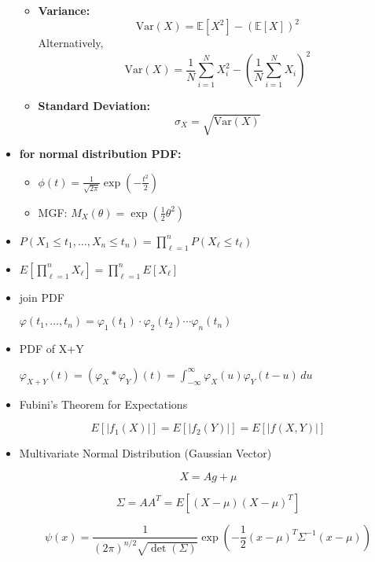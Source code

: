 \documentclass{article}
\begin{document}
\begin{itemize}
\begin{itemize}
\item \textbf{Variance:}
\[
\text{Var}(X) = \mathbb{E}[X^2] - (\mathbb{E}[X])^2
\]
Alternatively,
\[
\text{Var}(X) = \frac{1}{N} \sum_{i=1}^{N} X_i^2 - \left( \frac{1}{N} \sum_{i=1}^{N} X_i \right)^2
\]

\item \textbf{Standard Deviation:}
\[
\sigma_X = \sqrt{\text{Var}(X)}
\]
\end{itemize}

  \item \textbf{for normal distribution PDF:}

\begin{itemize}
\item  $
    \phi(t) = \frac{1}{\sqrt{2\pi}} \exp\left(-\frac{t^2}{2}\right)
    $
      \item MGF: $M_X(\theta) = \exp\left(\frac{1}{2} \theta^2\right)$
\end{itemize}
   

\item 
    $
    P(X_1 \leq t_1, \ldots, X_n \leq t_n) = \prod_{\ell=1}^{n} P(X_\ell \leq t_\ell)
    $

\item 

    $
    E\left[ \prod_{\ell=1}^{n} X_\ell \right] = \prod_{\ell=1}^{n} E[X_\ell]
    $

\item join PDF

$
    \varphi(t_1, \ldots, t_n) = \varphi_1(t_1) \cdot \varphi_2(t_2) \cdots \varphi_n(t_n)
  $

\item PDF of X+Y

$
    \varphi_{X+Y}(t) = (\varphi_X * \varphi_Y)(t) = \int_{-\infty}^{\infty} \varphi_X(u) \varphi_Y(t - u) \, du
$

\item Fubini's Theorem for Expectations

    \[
    E[|f_1(X)|] = E[|f_2(Y)|] = E[|f(X,Y)|]
    \]

\item Multivariate Normal Distribution (Gaussian Vector)

    \[
    X = A g + \mu
    \]

    \[
    \Sigma = A A^T = E[(X - \mu)(X - \mu)^T]
    \]

        \[
    \psi(x) = \frac{1}{(2\pi)^{n/2} \sqrt{\det(\Sigma)}} \exp\left(-\frac{1}{2} (x - \mu)^T \Sigma^{-1} (x - \mu)\right)
    \]



\end{itemize}
\end{document}
